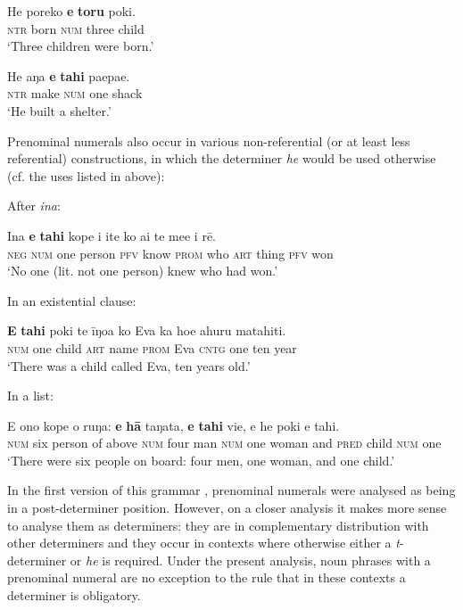 \ea\label{ex:5.56}
\gll He poreko \textbf{e} \textbf{toru} poki. \\
\textsc{ntr} born \textsc{num} three child \\

\glt 
‘Three children were born.’ \textstyleExampleref{[R352.010]} 
\z

\ea\label{ex:5.57}
\gll He aŋa \textbf{e} \textbf{tahi} paepae. \\
\textsc{ntr} make \textsc{num} one shack \\

\glt 
‘He built a shelter.’ \textstyleExampleref{[Blx-2-1.015]}
\z

Prenominal numerals also occur in various non-referential (or at least less referential) constructions, in which the determiner \textit{he} would be used otherwise (cf. the uses listed in  above): 

After \textit{{\ꞌ}ina}:

\ea\label{ex:5.58}
\gll {\ꞌ}Ina \textbf{e} \textbf{tahi} kope i {\ꞌ}ite ko ai te me{\ꞌ}e i rē. \\
\textsc{neg} \textsc{num} one person \textsc{pfv} know \textsc{prom} who \textsc{art} thing \textsc{pfv} won \\

\glt
‘No one (lit. not one person) knew who had won.’ \textstyleExampleref{[R448.018]} 
\z

In an existential clause:

\ea\label{ex:5.59}
\gll \textbf{E} \textbf{tahi} poki te {\ꞌ}īŋoa ko Eva ka ho{\ꞌ}e {\ꞌ}ahuru matahiti. \\
\textsc{num} one child \textsc{art} name \textsc{prom} Eva \textsc{cntg} one ten year \\

\glt
‘There was a child called Eva, ten years old.’ \textstyleExampleref{[R210.001]} 
\z

In a list:

\ea\label{ex:5.60}
\gll E ono kope o ruŋa: \textbf{e} \textbf{hā} taŋata, \textbf{e} \textbf{tahi} vi{\ꞌ}e, {\ꞌ}e he poki e tahi.\\
\textsc{num} six person of above \textsc{num} four man \textsc{num} one woman and \textsc{pred} child \textsc{num} one\\

\glt 
‘There were six people on board: four men, one woman, and one child.’ \textstyleExampleref{[R231.085]} 
\z

In the first version of this grammar \citep{Kieviet2016}, prenominal numerals were analysed as being in a post-determiner position. However, on a closer analysis it makes more sense to analyse them as determiners: they are in complementary distribution with other determiners and they occur in contexts where otherwise either a \textit{t}{}-determiner or \textit{he} is required. Under the present analysis, noun phrases with a prenominal numeral are no exception to the rule that in these contexts a determiner is obligatory.

